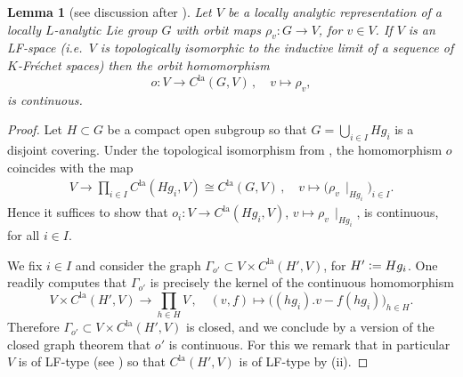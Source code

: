 \documentclass[a4paper, reqno, 10pt]{amsart}
\newtheorem{lemma}[theorem]{Lemma}
\theoremstyle{definition}
\numberwithin{equation}{section}
\newcommand{\defeq}{\vcentcolon=}
\newcommand{\la}{{\mathrm{la}}}
\newcommand{\lra}{\longrightarrow}
\newcommand{\lto}{\longmapsto}
\newcommand{\mto}{\mapsto}
\newcommand{\ra}{\rightarrow}
\newcommand{\res}[1]{{\!\,\mid_{#1}}}
\begin{document}
\begin{lemma}[{see discussion after \cite[Thm.\ 3.6.12]{Emerton17LocAnVect}}]\label{Lemma 1 - Continuity of the orbit homomorphism}
	Let $V$ be a locally analytic representation of a locally $L$-analytic Lie group $G$ with orbit maps $\rho_v \colon G \ra V$, for $v\in V$.
	If $V$ is an LF-space (i.e.\ $V$ is topologically isomorphic to the inductive limit of a sequence of $K$-Fr\'echet spaces) then the orbit homomorphism
	\begin{equation*}
		o\colon V \lra C^\la(G,V) \,,\quad v \lto \rho_v , 
	\end{equation*}
	is continuous.
\end{lemma}
\begin{proof}
	Let $H\subset G$ be a compact open subgroup so that $G = \bigcup_{i\in I} H g_i$ is a disjoint covering.
	Under the topological isomorphism from , the homomorphism $o$ coincides with the map
	\begin{align*}
		V \lra \prod_{i\in I} C^\la(H g_i, V) \cong C^\la (G,V) \,,\quad
		v \lto \big(\rho_{v} \res{H g_i} \big)_{i\in I} .
	\end{align*}
	Hence it suffices to show that $o_i \colon V \ra C^\la(H g_i, V)$, $v \mto \rho_v\res{H g_i}$, is continuous, for all $i\in I$.
	
	
	We fix $i\in I$ and consider the graph $\Gamma_{o'} \subset V \times C^\la(H',V)$, for $H' \defeq H g_i$.
	One readily computes that $\Gamma_{o'}$ is precisely the kernel of the continuous homomorphism
	\begin{equation*}
		V \times C^\la(H',V) \lra \prod_{h\in H} V \,,\quad (v,f) \lto \big((hg_i).v - f(hg_i)\big)_{h\in H} .
	\end{equation*}
	Therefore $\Gamma_{o'} \subset V \times C^\la(H',V)$ is closed, and we conclude by a version of the closed graph theorem \cite[II.\ \S 4.6 Prop.\ 10]{Bourbaki87TopVectSp1to5} that $o'$ is continuous.
	For this we remark that in particular $V$ is of LF-type (see \cite[p.\ 15]{Emerton17LocAnVect}) so that $C^\la(H',V)$ is of LF-type by  (ii).
\end{proof}
\end{document}
